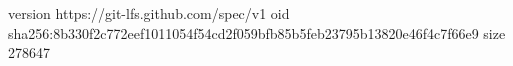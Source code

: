 version https://git-lfs.github.com/spec/v1
oid sha256:8b330f2c772eef1011054f54cd2f059bfb85b5feb23795b13820e46f4c7f66e9
size 278647
